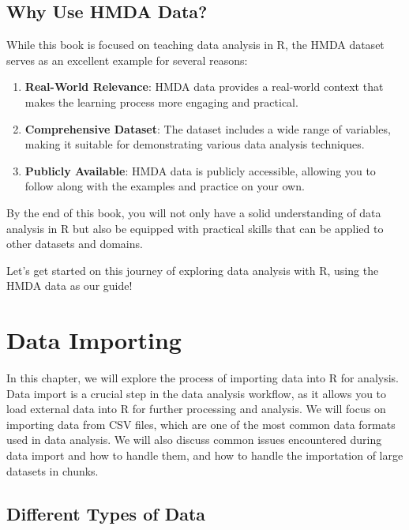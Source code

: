 \documentclass[
]{book}
\providecommand{\tightlist}{%
  \setlength{\itemsep}{0pt}\setlength{\parskip}{0pt}}
\begin{document}
\section{Why Use HMDA Data?}\label{why-use-hmda-data}

While this book is focused on teaching data analysis in R, the HMDA dataset serves as an excellent example for several reasons:

\begin{enumerate}
\def\labelenumi{\arabic{enumi}.}
\tightlist
\item
  \textbf{Real-World Relevance}: HMDA data provides a real-world context that makes the learning process more engaging and practical.
\item
  \textbf{Comprehensive Dataset}: The dataset includes a wide range of variables, making it suitable for demonstrating various data analysis techniques.
\item
  \textbf{Publicly Available}: HMDA data is publicly accessible, allowing you to follow along with the examples and practice on your own.
\end{enumerate}

By the end of this book, you will not only have a solid understanding of data analysis in R but also be equipped with practical skills that can be applied to other datasets and domains.

Let's get started on this journey of exploring data analysis with R, using the HMDA data as our guide!

\chapter{Data Importing}\label{data-importing}

In this chapter, we will explore the process of importing data into R for analysis. Data import is a crucial step in the data analysis workflow, as it allows you to load external data into R for further processing and analysis. We will focus on importing data from CSV files, which are one of the most common data formats used in data analysis. We will also discuss common issues encountered during data import and how to handle them, and how to handle the importation of large datasets in chunks.

\section{Different Types of Data}\label{different-types-of-data}
\end{document}
